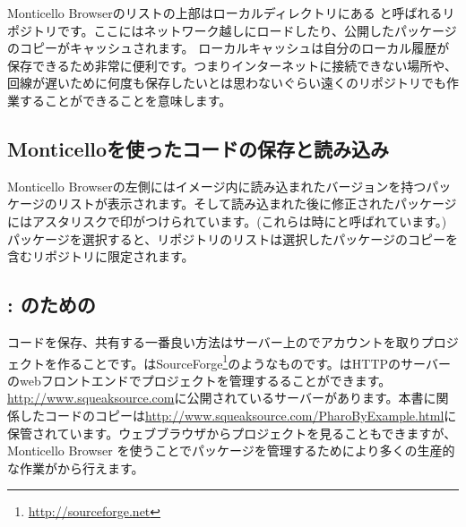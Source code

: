 \documentclass[a4paper,10pt,twoside]{book}
\begin{document}
Monticello Browserのリストの上部はローカルディレクトリにある と呼ばれるリポジトリです。ここにはネットワーク越しにロードしたり、公開したパッケージのコピーがキャッシュされます。
ローカルキャッシュは自分のローカル履歴が保存できるため非常に便利です。つまりインターネットに接続できない場所や、回線が遅いために何度も保存したいとは思わないぐらい遠くのリポジトリでも作業することができることを意味します。


\subsection{Monticelloを使ったコードの保存と読み込み}
Monticello Browserの左側にはイメージ内に読み込まれたバージョンを持つパッケージのリストが表示されます。そして読み込まれた後に修正されたパッケージにはアスタリスクで印がつけられています。(これらは時にと呼ばれています。) パッケージを選択すると、リポジトリのリストは選択したパッケージのコピーを含むリポジトリに限定されます。



\subsection{\ind{\sqsrc}: \pharo のための}

コードを保存、共有する一番良い方法は\sqsrc サーバー上のでアカウントを取りプロジェクトを作ることです。\sqsrc はSourceForge\footnote{\url{http://sourceforge.net}}のようなものです。\sqsrc はHTTPのサーバーのwebフロントエンドでプロジェクトを管理するることができます。
\url{http://www.squeaksource.com}に公開されている\sqsrc サーバーがあります。本書に関係したコードのコピーは\url{http://www.squeaksource.com/PharoByExample.html}に保管されています。ウェブブラウザからプロジェクトを見ることもできますが、Monticello Browser を使うことでパッケージを管理するためにより多くの生産的な作業が\pharo から行えます。

\end{document}
